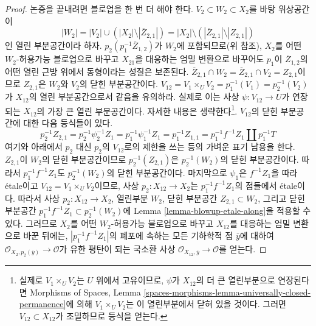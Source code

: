 \begin{proof}
\medskip\noindent
논증을 끝내려면 블로업을 한 번 더 해야 한다.
$V_2 \subset W_2 \subset X_2$를 바탕 위상공간이
$$
|W_2| =
|V_2| \cup (|X_2| \setminus |\overline{Z}_{2, 1}|) =
|X_2| \setminus \left(|\overline{Z}_{2, 1}| \setminus |Z_{2, 1}|\right)
$$
인 열린 부분공간이라 하자.
$p_2(p_1^{-1}\overline{Z}_{1, 2})$가 $W_2$에 포함되므로(위 참조),
$X_2$를 어떤 $W_2$-허용가능 블로업으로 바꾸고 $X_{21}$을 대응하는
엄밀 변환으로 바꾸어도 $p_1$이 $\overline{Z}_{1, 2}$의 어떤 열린
근방 위에서 동형이라는 성질은 보존된다.
$\overline{Z}_{2, 1} \cap W_2 =
\overline{Z}_{2, 1} \cap V_2 = Z_{2, 1}$이므로 $Z_{2, 1}$은
$W_2$와 $V_2$의 닫힌 부분공간이다.
$V_{12} = V_1 \times_U V_2 = p_1^{-1}(V_1) = p_2^{-1}(V_2)$가
$X_{12}$의 열린 부분공간으로서 같음을 유의하라. 실제로 이는 사상
$\psi : V_{12} \to U$가 연장되는 $X_{12}$의 가장 큰 열린
부분공간이다. 자세한 내용은 생략한다\footnote{실제로
$V_1 \times_U V_2$는 $U$ 위에서 고유이므로, $\psi$가 $X_{12}$의
더 큰 열린부분으로 연장된다면 Morphisms of Spaces, Lemma
\ref{spaces-morphisms-lemma-universally-closed-permanence}에 의해
$V_1 \times_U V_2$는 이 열린부분에서 닫혀 있을 것이다. 그러면
$V_{12} \subset X_{12}$가 조밀하므로 등식을 얻는다.}.
$V_{12}$의 닫힌 부분공간에 대한 다음 등식들이 있다.
$$
p_2^{-1}Z_{2, 1} = p_2^{-1} \psi_2^{-1} Z_1 =
p_1^{-1} \psi_1^{-1} Z_1= p_1^{-1}Z_{1, 1} =
p_1^{-1}f^{-1}Z_1 \amalg p_1^{-1}T
$$
여기와 아래에서 $p_2$ 대신 $p_2$의 $V_{12}$로의 제한을 쓰는 등의
가벼운 표기 남용을 한다. $Z_{2, 1}$이 $W_2$의 닫힌 부분공간이므로
$p_2^{-1}(Z_{2, 1})$은 $p_2^{-1}(W_2)$의 닫힌 부분공간이다.
따라서 $p_1^{-1}f^{-1}Z_1$도 $p_2^{-1}(W_2)$의 닫힌 부분공간이다.
마지막으로 $\psi_1$은 $f^{-1}Z_1$을 따라 \'etale이고
$V_{12} = V_1 \times_U V_2$이므로, 사상
$p_2 : X_{12} \to X_2$는 $p_1^{-1}f^{-1}Z_1$의 점들에서
\'etale이다. 따라서 사상 $p_2 : X_{12} \to X_2$, 열린부분 $W_2$,
닫힌 부분공간 $Z_{2, 1} \subset W_2$, 그리고 닫힌 부분공간
$p_1^{-1}f^{-1}Z_1 \subset p_2^{-1}(W_2)$에
Lemma \ref{lemma-blowup-etale-along}을 적용할 수 있다.
그러므로 $X_2$를 어떤 $W_2$-허용가능 블로업으로 바꾸고
$X_{12}$를 대응하는 엄밀 변환으로 바꾼 뒤에는,
$|p_1^{-1}f^{-1}Z_1|$의 폐포에 속하는 모든 기하학적 점
$\overline{y}$에 대하여
$\mathcal{O}_{X_2, p_2(\overline{y})} \to \mathcal{O}$가 유한
평탄이 되는 국소환 사상
$\mathcal{O}_{X_{12}, \overline{y}} \to \mathcal{O}$를 얻는다.


\end{proof}
